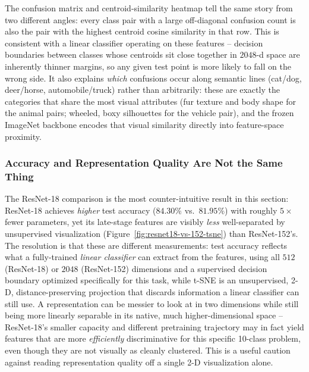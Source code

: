 The confusion matrix and centroid-similarity heatmap tell the same story
from two different angles: every class pair with a large off-diagonal
confusion count is also the pair with the highest centroid cosine
similarity in that row. This is consistent with a linear classifier
operating on these features -- decision boundaries between classes whose
centroids sit close together in $2048$-d space are inherently thinner
margins, so any given test point is more likely to fall on the wrong side.
It also explains \emph{which} confusions occur along semantic lines
(cat/dog, deer/horse, automobile/truck) rather than arbitrarily: these are
exactly the categories that share the most visual attributes (fur texture
and body shape for the animal pairs; wheeled, boxy silhouettes for the
vehicle pair), and the frozen ImageNet backbone encodes that visual
similarity directly into feature-space proximity.

\subsubsection{Accuracy and Representation Quality Are Not the Same Thing}

The ResNet-18 comparison is the most counter-intuitive result in this
section: ResNet-18 achieves \emph{higher} test accuracy ($84.30\%$ vs.\
$81.95\%$) with roughly $5\times$ fewer parameters, yet its late-stage
features are visibly \emph{less} well-separated by unsupervised
visualization (Figure~\ref{fig:resnet18-vs-152-tsne}) than ResNet-152's.
The resolution is that these are different measurements: test accuracy
reflects what a fully-trained \emph{linear classifier} can extract from the
features, using all $512$ (ResNet-18) or $2048$ (ResNet-152) dimensions and
a supervised decision boundary optimized specifically for this task, while
t-SNE is an unsupervised, 2-D, distance-preserving projection that discards
information a linear classifier can still use. A representation can be
messier to look at in two dimensions while still being more linearly
separable in its native, much higher-dimensional space -- ResNet-18's
smaller capacity and different pretraining trajectory may in fact yield
features that are more \emph{efficiently} discriminative for this specific
10-class problem, even though they are not visually as cleanly clustered.
This is a useful caution against reading representation quality off a
single 2-D visualization alone.
